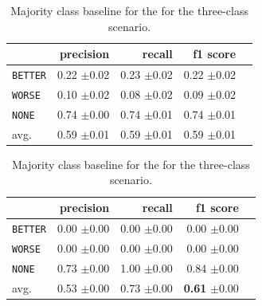 \begin{table}[!htb]
	\begin{minipage}{.5\linewidth}
		\caption{Random (stratified) baseline for the three-class scenario.}
		\label{tbl:3stratifiedbaseline}
		\centering
		      
		\begin{tabularx}{0.97\linewidth}{Xrrrr}
			\toprule
			                & precision                    & recall                       & f1 score                     \\ \midrule 
			\texttt{BETTER} & 0.22 \scriptsize{$\pm$0.02} & 0.23 \scriptsize{$\pm$0.02} & 0.22 \scriptsize{$\pm$0.02} \\ 
			\texttt{WORSE}  & 0.10 \scriptsize{$\pm$0.02} & 0.08 \scriptsize{$\pm$0.02} & 0.09 \scriptsize{$\pm$0.02} \\ 
			\texttt{NONE}   & 0.74 \scriptsize{$\pm$0.00}  & 0.74 \scriptsize{$\pm$0.01} & 0.74 \scriptsize{$\pm$0.01} \\ 
			avg.         & 0.59 \scriptsize{$\pm$0.01} & 0.59 \scriptsize{$\pm$0.01} & 0.59 \scriptsize{$\pm$0.01} \\ 
			\bottomrule
		\end{tabularx} 
		
	\end{minipage}%
	\begin{minipage}{.5\linewidth}
		\centering
		\caption{Majority class baseline for the  for the three-class scenario.}
		\label{tbl:3majoritybaseline}
		\begin{tabularx}{0.97\linewidth}{Xrrrr}
			\toprule
			                & precision                    & recall                       & f1 score                                    \\ \midrule 
			\texttt{BETTER} & 0.00 \scriptsize{$\pm$0.00} & 0.00 \scriptsize{$\pm$0.00} & 0.00 \scriptsize{$\pm$0.00}                \\ 
			\texttt{WORSE}  & 0.00 \scriptsize{$\pm$0.00} & 0.00 \scriptsize{$\pm$0.00} & 0.00 \scriptsize{$\pm$0.00}                \\ 
			\texttt{NONE}   & 0.73 \scriptsize{$\pm$0.00}     & 1.00 \scriptsize{$\pm$0.00} & 0.84 \scriptsize{$\pm$0.00}                \\ 
			avg.         & 0.53 \scriptsize{$\pm$0.00} & 0.73 \scriptsize{$\pm$0.00} & \textbf{0.61} \scriptsize{$\pm$0.00} \\ 
			\bottomrule
		\end{tabularx}
	\end{minipage} 
\end{table}


